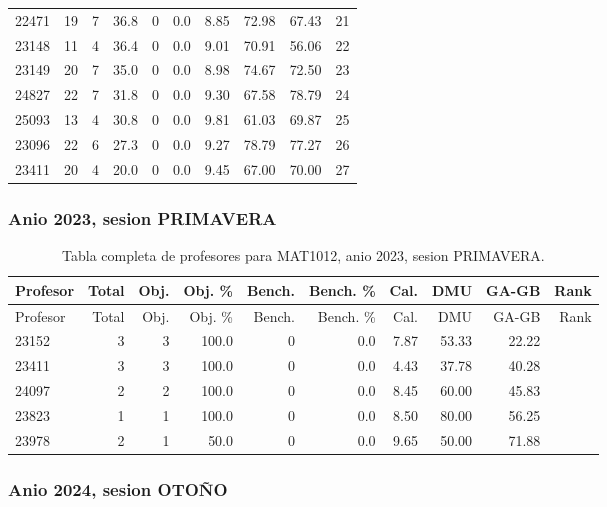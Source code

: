\begin{longtable}{lrrrrrrrrr}
22471 & 19 & 7 & 36.8 & 0 & 0.0 & 8.85 & 72.98 & 67.43 & 21 \\
23148 & 11 & 4 & 36.4 & 0 & 0.0 & 9.01 & 70.91 & 56.06 & 22 \\
23149 & 20 & 7 & 35.0 & 0 & 0.0 & 8.98 & 74.67 & 72.50 & 23 \\
24827 & 22 & 7 & 31.8 & 0 & 0.0 & 9.30 & 67.58 & 78.79 & 24 \\
25093 & 13 & 4 & 30.8 & 0 & 0.0 & 9.81 & 61.03 & 69.87 & 25 \\
23096 & 22 & 6 & 27.3 & 0 & 0.0 & 9.27 & 78.79 & 77.27 & 26 \\
23411 & 20 & 4 & 20.0 & 0 & 0.0 & 9.45 & 67.00 & 70.00 & 27 \\
\bottomrule
\end{longtable}
\endgroup

\subsubsection{Anio 2023, sesion PRIMAVERA}

\begingroup
\scriptsize
\setlength{\tabcolsep}{3pt}
\begin{longtable}{lrrrrrrrrr}
\caption{Tabla completa de profesores para MAT1012, anio 2023, sesion PRIMAVERA.}\label{tab:prof-period-mat1012-2023-primavera}\\
\toprule
Profesor & Total & Obj. & Obj. \% & Bench. & Bench. \% & Cal. & DMU & GA-GB & Rank \\
\midrule
\endfirsthead
\toprule
Profesor & Total & Obj. & Obj. \% & Bench. & Bench. \% & Cal. & DMU & GA-GB & Rank \\
\midrule
\endhead
23152 & 3 & 3 & 100.0 & 0 & 0.0 & 7.87 & 53.33 & 22.22 &  \\
23411 & 3 & 3 & 100.0 & 0 & 0.0 & 4.43 & 37.78 & 40.28 &  \\
24097 & 2 & 2 & 100.0 & 0 & 0.0 & 8.45 & 60.00 & 45.83 &  \\
23823 & 1 & 1 & 100.0 & 0 & 0.0 & 8.50 & 80.00 & 56.25 &  \\
23978 & 2 & 1 & 50.0 & 0 & 0.0 & 9.65 & 50.00 & 71.88 &  \\
\bottomrule
\end{longtable}
\endgroup

\subsubsection{Anio 2024, sesion OTOÑO}

